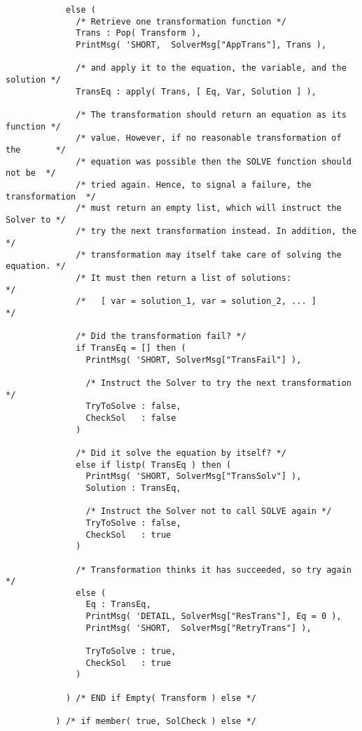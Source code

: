\begin{verbatim}
            else (
              /* Retrieve one transformation function */
              Trans : Pop( Transform ),
              PrintMsg( 'SHORT,  SolverMsg["AppTrans"], Trans ),

              /* and apply it to the equation, the variable, and the solution */
              TransEq : apply( Trans, [ Eq, Var, Solution ] ),

              /* The transformation should return an equation as its function */
              /* value. However, if no reasonable transformation of the       */
              /* equation was possible then the SOLVE function should not be  */
              /* tried again. Hence, to signal a failure, the transformation  */
              /* must return an empty list, which will instruct the Solver to */
              /* try the next transformation instead. In addition, the        */
              /* transformation may itself take care of solving the equation. */
              /* It must then return a list of solutions:                     */
              /*   [ var = solution_1, var = solution_2, ... ]                */

              /* Did the transformation fail? */
              if TransEq = [] then (
                PrintMsg( 'SHORT, SolverMsg["TransFail"] ),

                /* Instruct the Solver to try the next transformation */
                TryToSolve : false,
                CheckSol   : false
              )

              /* Did it solve the equation by itself? */
              else if listp( TransEq ) then (
                PrintMsg( 'SHORT, SolverMsg["TransSolv"] ),
                Solution : TransEq,

                /* Instruct the Solver not to call SOLVE again */
                TryToSolve : false,
                CheckSol   : true
              )

              /* Transformation thinks it has succeeded, so try again */
              else (
                Eq : TransEq,
                PrintMsg( 'DETAIL, SolverMsg["ResTrans"], Eq = 0 ),
                PrintMsg( 'SHORT,  SolverMsg["RetryTrans"] ),

                TryToSolve : true,
                CheckSol   : true
              )

            ) /* END if Empty( Transform ) else */

          ) /* if member( true, SolCheck ) else */


\end{verbatim}
